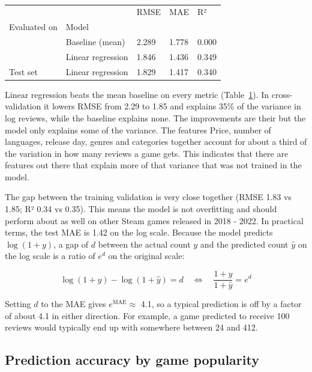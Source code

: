\documentclass[
  letterpaper,
  DIV=11,
  numbers=noendperiod]{scrartcl}
\newcounter{none} %
\begin{document}
\begin{longtable}[]{@{}lllll@{}}

\caption{\label{tbl-performance}}

\tabularnewline

\toprule\noalign{}
& & RMSE & MAE & R² \\
Evaluated on & Model & & & \\
\midrule\noalign{}
\endhead
\bottomrule\noalign{}
\endlastfoot
\multirow{2}{*}{Cross-validation} & Baseline (mean) & 2.289 & 1.778 &
0.000 \\
& Linear regression & 1.846 & 1.436 & 0.349 \\
Test set & Linear regression & 1.829 & 1.417 & 0.340 \\

\end{longtable}

Linear regression beats the mean baseline on every metric
(Table~\ref{tbl-performance}). In cross-validation it lowers RMSE from
2.29 to 1.85 and explains 35\% of the variance in log reviews, while the
baseline explains none. The improvements are their but the model only
explains some of the variance. The features Price, number of languages,
release day, genres and categories together account for about a third of
the variation in how many reviews a game gets. This indicates that there
are features out there that explain more of that variance that was not
trained in the model.

The gap between the training validation is very close together (RMSE
1.83 vs 1.85; R² 0.34 vs 0.35). This means the model is not overfitting
and should perform about as well on other Steam games released in 2018 -
2022. In practical terms, the test MAE is 1.42 on the log scale. Because
the model predicts \(\log(1 + y)\), a gap of \(d\) between the actual
count \(y\) and the predicted count \(\hat{y}\) on the log scale is a
ratio of \(e^{d}\) on the original scale:

\[
\log(1 + y) - \log(1 + \hat{y}) = d
\quad \Longleftrightarrow \quad
\frac{1 + y}{1 + \hat{y}} = e^{d}
\]

Setting \(d\) to the MAE gives \(e^{\text{MAE}} \approx\) 4.1, so a
typical prediction is off by a factor of about 4.1 in either direction.
For example, a game predicted to receive 100 reviews would typically end
up with somewhere between 24 and 412.

\subsection{Prediction accuracy by game
popularity}\label{prediction-accuracy-by-game-popularity}
\end{document}

